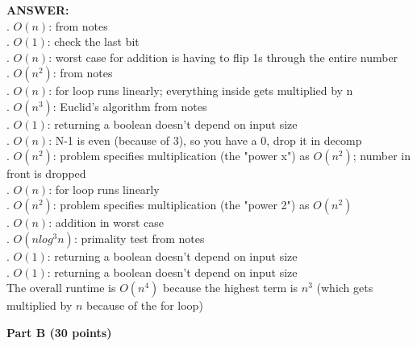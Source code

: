 \documentclass{article}
\begin{document}
{\bfseries ANSWER: }\\
. $O(n)$: from notes\\
. $O(1)$: check the last bit\\
. $O(n)$: worst case for addition is having to flip 1s through the entire number\\
. $O(n^2)$: from notes\\
. $O(n)$: for loop runs linearly; everything inside gets multiplied by n\\
. $O(n^3)$: Euclid's algorithm from notes\\
. $O(1)$: returning a boolean doesn't depend on input size\\
. $O(n)$: N-1 is even (because of 3), so you have a 0, drop it in decomp\\
. $O(n^2)$: problem specifies multiplication (the "power x") as $O(n^2)$; number in front is dropped\\
. $O(n)$: for loop runs linearly\\
. $O(n^2)$: problem specifies multiplication (the "power 2") as $O(n^2)$\\
. $O(n)$: addition in worst case\\
. $O(n log^3n)$: primality test from notes\\
. $O(1)$: returning a boolean doesn't depend on input size\\
. $O(1)$: returning a boolean doesn't depend on input size\\
\indent The overall runtime is $O(n^4)$ because the highest term is $n^3$ (which gets multiplied by $n$ because of the for loop)

\begin{center}
{\bf Part B (30 points)}
\end{center}
\end{document}
